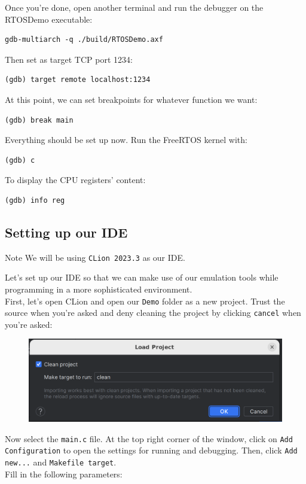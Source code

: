 \documentclass[10pt]{article}
\begin{document}
Once you're done, open another terminal and run the debugger on the RTOSDemo executable:
\begin{lstlisting}
gdb-multiarch -q ./build/RTOSDemo.axf
\end{lstlisting}
Then set as target TCP port 1234:
\begin{lstlisting}
(gdb) target remote localhost:1234
\end{lstlisting}
At this point, we can set breakpoints for whatever function we want:
\begin{lstlisting}
(gdb) break main
\end{lstlisting}
Everything should be set up now. Run the FreeRTOS kernel with:
\begin{lstlisting}
(gdb) c
\end{lstlisting}


To display the CPU registers' content:
\begin{lstlisting}
(gdb) info reg
\end{lstlisting}



\subsection{Setting up our IDE}

\begin{example}{Note}
    We will be using \verb|CLion 2023.3| as our IDE.
\end{example}

Let's set up our IDE so that we can make use of our emulation tools while programming in a more sophisticated environment.\\
First, let's open CLion and open our \verb|Demo| folder as a new project. Trust the source when you're asked and deny cleaning the project by clicking \verb|cancel| when you're asked:\\

\begin{figure}[H]
    \centering
    \includegraphics[width=0.5\linewidth]{Pictures/1.png}
    \caption{}
    \label{fig:1}
\end{figure}

Now select the \verb|main.c| file. At the top right corner of the window, click on \verb|Add Configuration| to open the settings for running and debugging. Then, click \verb|Add new...| and \verb|Makefile target|. \\
Fill in the following parameters:\\
\end{document}
